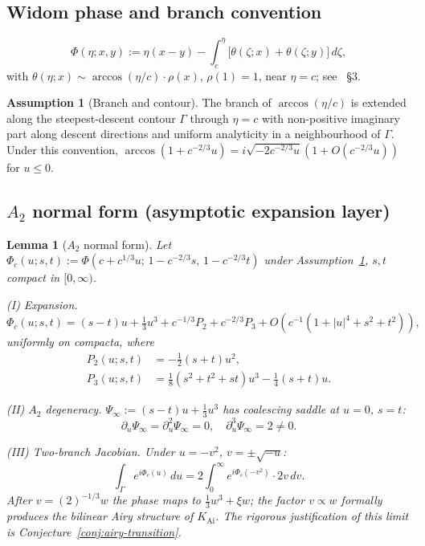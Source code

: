 \documentclass[12pt,a4paper]{amsart}
\newtheorem{lemma}[theorem]{Lemma}
\theoremstyle{definition}
\newtheorem{assumption}[theorem]{Assumption}
\theoremstyle{remark}
\begin{document}
\subsection{Widom phase and branch convention}

\begin{equation}\label{eq:effective-phase-def}
  \Phi(\eta;x,y):=\eta(x-y)
  -\int_c^\eta\bigl[\theta(\zeta;x)+\theta(\zeta;y)\bigr]\,d\zeta,
\end{equation}
with $\theta(\eta;x)\sim\arccos(\eta/c)\cdot\rho(x)$, $\rho(1)=1$,
near $\eta=c$; see~\cite{Widom1964} \S3.

\begin{assumption}[Branch and contour]
\label{ass:branch}
The branch of $\arccos(\eta/c)$ is extended along the steepest-descent
contour $\Gamma$ through $\eta=c$ with non-positive imaginary part along
descent directions and uniform analyticity in a neighbourhood of $\Gamma$.
Under this convention,
$\arccos(1+c^{-2/3}u)=i\sqrt{-2c^{-2/3}u}(1+O(c^{-2/3}u))$ for $u\le 0$.
\end{assumption}

\subsection{$A_2$ normal form (asymptotic expansion layer)}

\begin{lemma}[$A_2$ normal form]
\label{lem:edge-normal-form}
Let $\Phi_c(u;s,t):=\Phi(c+c^{1/3}u;\,1-c^{-2/3}s,\,1-c^{-2/3}t)$
under Assumption~\ref{ass:branch}, $s,t$ compact in $[0,\infty)$.

\medskip
\textup{(I) Expansion.}
\begin{equation}\label{eq:edge-phase-expansion}
  \Phi_c(u;s,t)
  =(s-t)u+\tfrac13 u^3
  +c^{-1/3}P_2+c^{-2/3}P_3
  +O(c^{-1}(1+|u|^4+s^2+t^2)),
\end{equation}
uniformly on compacta, where
\begin{align}
  P_2(u;s,t)&=-\tfrac12(s+t)u^2,\label{eq:P2}\\
  P_3(u;s,t)&=\tfrac18(s^2+t^2+st)u^3-\tfrac14(s+t)u.\label{eq:P3}
\end{align}

\medskip
\textup{(II) $A_2$ degeneracy.}
$\Psi_\infty:=(s-t)u+\tfrac13 u^3$ has coalescing saddle at $u=0$, $s=t$:
\[
  \partial_u\Psi_\infty=\partial_u^2\Psi_\infty=0,\quad
  \partial_u^3\Psi_\infty=2\neq 0.
\]

\medskip
\textup{(III) Two-branch Jacobian.}
Under $u=-v^2$, $v=\pm\sqrt{-u}$:
\begin{equation}\label{eq:two-branch}
  \int_\Gamma e^{i\Phi_c(u)}\,du
  =2\int_0^\infty e^{i\Phi_c(-v^2)}\cdot 2v\,dv.
\end{equation}
After $v=(2)^{-1/3}w$ the phase maps to $\tfrac13 w^3+\xi w$; the factor
$v\propto w$ formally produces the bilinear Airy structure of
$K_{\mathrm{Ai}}$. The rigorous justification of this limit is
Conjecture~\ref{conj:airy-transition}.
\end{lemma}
\end{document}
